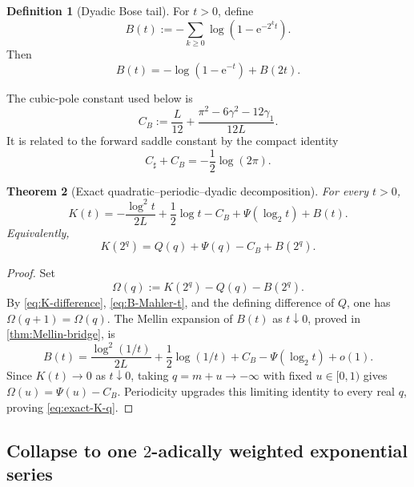 \documentclass[11pt,oneside]{article}
\numberwithin{equation}{section}
\newtheorem{theorem}{Theorem}[section]
\theoremstyle{definition}
\newtheorem{definition}[theorem]{Definition}
\theoremstyle{remark}
\newcommand{\e}{\mathrm e}
\begin{document}
\begin{definition}[Dyadic Bose tail]
\label{def:B-tail}
For $t>0$, define
\begin{equation}
 B(t):=-\sum_{k\ge0}\log(1-\e^{-2^kt}).
 \label{eq:B-product}
\end{equation}
Then
\begin{equation}
 B(t)=-\log(1-\e^{-t})+B(2t).
 \label{eq:B-Mahler-t}
\end{equation}
\end{definition}

The cubic-pole constant used below is
\begin{equation}
 C_B:=\frac L{12}
 +\frac{\pi^2-6\gamma^2-12\gamma_1}{12L}.
 \label{eq:CB}
\end{equation}
It is related to the forward saddle constant by the compact identity
\begin{equation}
 C_{\sharp}+C_B=-\frac12\log(2\pi).
 \label{eq:C-relation}
\end{equation}

\begin{theorem}[Exact quadratic--periodic--dyadic decomposition]
\label{thm:exact-K-decomposition}
For every $t>0$,
\begin{equation}
\boxed{
 K(t)=-\frac{\log^2t}{2L}+\frac12\log t-C_B
      +\Psi(\log_2t)+B(t).}
 \label{eq:exact-K-decomposition}
\end{equation}
Equivalently,
\begin{equation}
 K(2^q)=Q(q)+\Psi(q)-C_B+B(2^q).
 \label{eq:exact-K-q}
\end{equation}
\end{theorem}

\begin{proof}
Set
\[
 \Omega(q):=K(2^q)-Q(q)-B(2^q).
\]
By \eqref{eq:K-difference}, \eqref{eq:B-Mahler-t}, and the defining difference
of $Q$, one has $\Omega(q+1)=\Omega(q)$.  The Mellin expansion of $B(t)$ as
$t\downarrow0$, proved in \cref{thm:Mellin-bridge}, is
\[
 B(t)=\frac{\log^2(1/t)}{2L}+\frac12\log(1/t)+C_B
      -\Psi(\log_2t)+o(1).
\]
Since $K(t)\to0$ as $t\downarrow0$, taking $q=m+u\to-\infty$ with fixed
$u\in[0,1)$ gives $\Omega(u)=\Psi(u)-C_B$.  Periodicity upgrades this limiting
identity to every real $q$, proving \eqref{eq:exact-K-q}.
\end{proof}

\subsection{Collapse to one \texorpdfstring{$2$}{2}-adically weighted exponential series}
\end{document}
